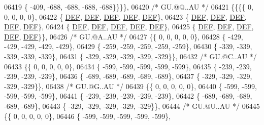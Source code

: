 \begin{DoxyCode}
06419 \{ -409, -688, -688, -688, -688\}\}\}\},
06420 \textcolor{comment}{/* GU.@@..AU */}
06421 \{\{\{\{    0,    0,    0,    0,    0\},
06422 \{  \mbox{\hyperlink{1_88_84__epars_8h_a397419fc12b37ed479c8abb9d444d843}{DEF}},  \mbox{\hyperlink{1_88_84__epars_8h_a397419fc12b37ed479c8abb9d444d843}{DEF}},  \mbox{\hyperlink{1_88_84__epars_8h_a397419fc12b37ed479c8abb9d444d843}{DEF}},  \mbox{\hyperlink{1_88_84__epars_8h_a397419fc12b37ed479c8abb9d444d843}{DEF}},  \mbox{\hyperlink{1_88_84__epars_8h_a397419fc12b37ed479c8abb9d444d843}{DEF}}\},
06423 \{  \mbox{\hyperlink{1_88_84__epars_8h_a397419fc12b37ed479c8abb9d444d843}{DEF}},  \mbox{\hyperlink{1_88_84__epars_8h_a397419fc12b37ed479c8abb9d444d843}{DEF}},  \mbox{\hyperlink{1_88_84__epars_8h_a397419fc12b37ed479c8abb9d444d843}{DEF}},  \mbox{\hyperlink{1_88_84__epars_8h_a397419fc12b37ed479c8abb9d444d843}{DEF}},  \mbox{\hyperlink{1_88_84__epars_8h_a397419fc12b37ed479c8abb9d444d843}{DEF}}\},
06424 \{  \mbox{\hyperlink{1_88_84__epars_8h_a397419fc12b37ed479c8abb9d444d843}{DEF}},  \mbox{\hyperlink{1_88_84__epars_8h_a397419fc12b37ed479c8abb9d444d843}{DEF}},  \mbox{\hyperlink{1_88_84__epars_8h_a397419fc12b37ed479c8abb9d444d843}{DEF}},  \mbox{\hyperlink{1_88_84__epars_8h_a397419fc12b37ed479c8abb9d444d843}{DEF}},  \mbox{\hyperlink{1_88_84__epars_8h_a397419fc12b37ed479c8abb9d444d843}{DEF}}\},
06425 \{  \mbox{\hyperlink{1_88_84__epars_8h_a397419fc12b37ed479c8abb9d444d843}{DEF}},  \mbox{\hyperlink{1_88_84__epars_8h_a397419fc12b37ed479c8abb9d444d843}{DEF}},  \mbox{\hyperlink{1_88_84__epars_8h_a397419fc12b37ed479c8abb9d444d843}{DEF}},  \mbox{\hyperlink{1_88_84__epars_8h_a397419fc12b37ed479c8abb9d444d843}{DEF}},  \mbox{\hyperlink{1_88_84__epars_8h_a397419fc12b37ed479c8abb9d444d843}{DEF}}\}\},
06426 \textcolor{comment}{/* GU.@A..AU */}
06427 \{\{    0,    0,    0,    0,    0\},
06428 \{ -429, -429, -429, -429, -429\},
06429 \{ -259, -259, -259, -259, -259\},
06430 \{ -339, -339, -339, -339, -339\},
06431 \{ -329, -329, -329, -329, -329\}\},
06432 \textcolor{comment}{/* GU.@C..AU */}
06433 \{\{    0,    0,    0,    0,    0\},
06434 \{ -599, -599, -599, -599, -599\},
06435 \{ -239, -239, -239, -239, -239\},
06436 \{ -689, -689, -689, -689, -689\},
06437 \{ -329, -329, -329, -329, -329\}\},
06438 \textcolor{comment}{/* GU.@G..AU */}
06439 \{\{    0,    0,    0,    0,    0\},
06440 \{ -599, -599, -599, -599, -599\},
06441 \{ -239, -239, -239, -239, -239\},
06442 \{ -689, -689, -689, -689, -689\},
06443 \{ -329, -329, -329, -329, -329\}\},
06444 \textcolor{comment}{/* GU.@U..AU */}
06445 \{\{    0,    0,    0,    0,    0\},
06446 \{ -599, -599, -599, -599, -599\},

\end{DoxyCode}
